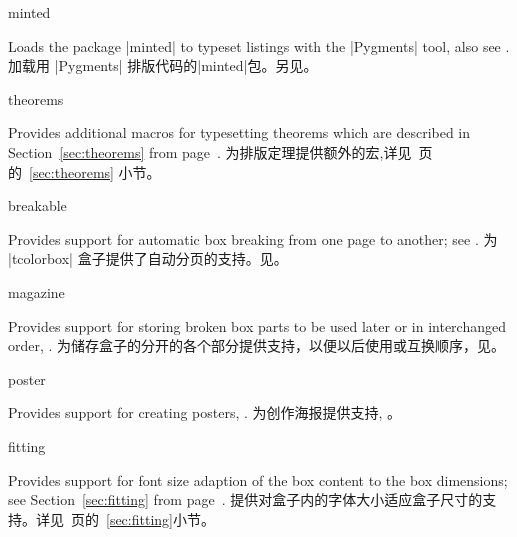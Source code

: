 \begin{docTcbKey}[library]{minted}{}{}
\begin{stripedbox}
Loads the package |minted| %
to typeset listings with the |Pygments| %
 tool, also see .
\tcblower
加载用 |Pygments| %
排版代码的|minted|包。另见。
\end{stripedbox}
\end{docTcbKey}

\begin{docTcbKey}[library]{theorems}{}{}
\begin{stripedbox}
Provides additional
macros for typesetting theorems which are described in Section~\ref{sec:theorems}
from page~\pageref{sec:theorems}.
\tcblower
为排版定理提供额外的宏,详见~\pageref{sec:theorems}页的~\ref{sec:theorems} 小节。
\end{stripedbox}
\end{docTcbKey}

\begin{docTcbKey}[library]{breakable}{}{}
\begin{stripedbox}
Provides support for automatic box breaking from one page to another;
see .
\tcblower
为 |tcolorbox| 盒子提供了自动分页的支持。见。
\end{stripedbox}
\end{docTcbKey}

\begin{docTcbKey}[library]{magazine}{}{}
\begin{stripedbox}
Provides support for storing broken box parts to be used later or
in interchanged order, .
\tcblower
为储存盒子的分开的各个部分提供支持，以便以后使用或互换顺序，见。
\end{stripedbox}
\end{docTcbKey}

\begin{docTcbKey}[library]{poster}{}{}
\begin{stripedbox}
Provides support for creating posters, .
\tcblower
为创作海报提供支持, 。
\end{stripedbox}
\end{docTcbKey}

\begin{docTcbKey}[library]{fitting}{}{}
\begin{stripedbox}
Provides support for font size adaption of the box content to
the box dimensions;
see Section~\ref{sec:fitting} from page~\pageref{sec:fitting}.
\tcblower
提供对盒子内的字体大小适应盒子尺寸的支持。详见~\pageref{sec:fitting}页的~\ref{sec:fitting}小节。
\end{stripedbox}
\end{docTcbKey}

